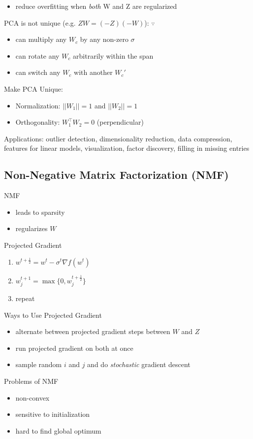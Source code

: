\documentclass[10pt,landscape,a4paper]{article}
\begin{document}
\begin{multicols*}{5}
\begin{itemize}
    \item reduce overfitting when \emph{both} W and Z are regularized
\end{itemize}
PCA is not unique (e.g. \(ZW = (-Z)(-W)\)): \(\because\)
\begin{itemize}
    \item can multiply any \(W_c\) by any non-zero \(\sigma\)
    \item can rotate any \(W_c\) arbitrarily within the span
    \item can switch any \(W_c\) with another \(W_c'\)
\end{itemize}
Make PCA Unique:
\begin{itemize}
    \item Normalization: \(||W_1|| = 1\) and \(||W_2|| = 1\)
    \item Orthogonality: \(W_1^\intercal W_2 = 0\) (perpendicular)
\end{itemize}
Applications: outlier detection, dimensionality reduction, data compression, features for linear models, visualization, factor discovery, filling in missing entries \\

\subsection{Non-Negative Matrix Factorization (NMF)}
NMF
\begin{itemize}
    \item leads to sparsity
    \item regularizes \(W\)
\end{itemize}
Projected Gradient
\begin{enumerate}
    \item \(w^{t+\frac{1}{2}} = w^t - \sigma^t \nabla f(w^t)\)
    \item \(w_j^{t+1} = \max \{0, w_j^{t+\frac{1}{2}}\} \)
    \item repeat
\end{enumerate}
Ways to Use Projected Gradient
\begin{itemize}
    \item alternate between projected gradient steps between \(W\) and \(Z\)
    \item run projected gradient on both at once
    \item sample random \(i\) and \(j\) and do \emph{stochastic} gradient descent
\end{itemize}
Problems of NMF
\begin{itemize}
    \item non-convex
    \item sensitive to initialization
    \item hard to find global optimum
\end{itemize}


\end{multicols*}
\end{document}
